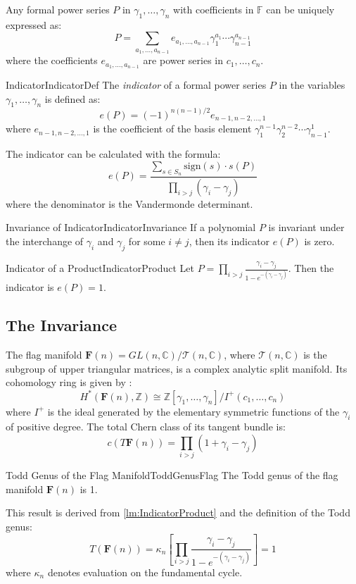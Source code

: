 \documentclass{book}
\newenvironment{Proof}[1][]
  {\begin{ProofTcb}[#1]}
  {\end{ProofTcb}}
\begin{document}
Any formal power series $P$ in $\gamma_1, \dots, \gamma_n$ with coefficients in $\mathbb{F}$ can be uniquely expressed as:
\[
P = \sum_{a_1, \dots, a_{n-1}} e_{a_1, \dots, a_{n-1}} \gamma_1^{a_1} \cdots \gamma_{n-1}^{a_{n-1}}
\]
where the coefficients $e_{a_1, \dots, a_{n-1}}$ are power series in $c_1, \dots, c_n$.

\begin{defn}{Indicator}{IndicatorDef}
The \emph{indicator} of a formal power series $P$ in the variables $\gamma_1, \dots, \gamma_n$ is defined as:
\[
e(P) = (-1)^{n(n-1)/2} e_{n-1, n-2, \dots, 1}
\]
where $e_{n-1, n-2, \dots, 1}$ is the coefficient of the basis element $\gamma_1^{n-1}\gamma_2^{n-2}\cdots\gamma_{n-1}^1$.
\end{defn}

The indicator can be calculated with the formula:
\[
e(P) = \frac{\sum_{s \in S_n} \text{sign}(s) \cdot s(P)}{\prod_{i>j} (\gamma_i - \gamma_j)}
\]
where the denominator is the Vandermonde determinant.

\begin{lem}{Invariance of Indicator}{IndicatorInvariance}
If a polynomial $P$ is invariant under the interchange of $\gamma_i$ and $\gamma_j$ for some $i \neq j$, then its indicator $e(P)$ is zero.
\end{lem}

\begin{lem}{Indicator of a Product}{IndicatorProduct}
Let $P = \prod_{i>j} \frac{\gamma_i - \gamma_j}{1 - e^{-(\gamma_i - \gamma_j)}}$. Then the indicator is $e(P) = 1$.
\end{lem}

\subsection*{The Invariance}

The flag manifold $\mathbf{F}(n) = GL(n, \mathbb{C}) / \mathcal{T}(n, \mathbb{C})$, where $\mathcal{T}(n,
\mathbb{C})$ is the subgroup of upper triangular matrices, is a complex analytic split manifold. Its
cohomology ring is given by \cite{NateKTheory}:
\[
H^*(\mathbf{F}(n), \mathbb{Z}) \cong \mathbb{Z}[\gamma_1, \dots, \gamma_n] / I^+(c_1, \dots, c_n)
\]
where $I^+$ is the ideal generated by the elementary symmetric functions of the $\gamma_i$ of positive degree. The total Chern class of its tangent bundle is:
\[
c(T\mathbf{F}(n)) = \prod_{i>j} (1 + \gamma_i - \gamma_j)
\]

\begin{thm}{Todd Genus of the Flag Manifold}{ToddGenusFlag}
The Todd genus of the flag manifold $\mathbf{F}(n)$ is 1.
\end{thm}
\begin{Proof}
This result is derived from \cref{lm:IndicatorProduct} and the definition of the Todd genus:
\[
T(\mathbf{F}(n)) = \kappa_n \left[ \prod_{i>j} \frac{\gamma_i - \gamma_j}{1 - e^{-(\gamma_i - \gamma_j)}} \right] = 1
\]
where $\kappa_n$ denotes evaluation on the fundamental cycle.
\end{Proof}
\end{document}
